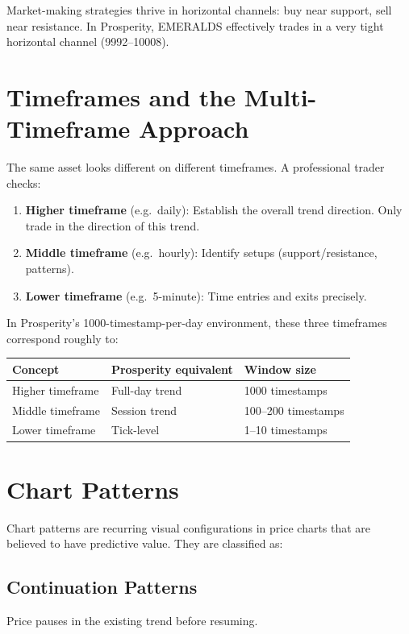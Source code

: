 \documentclass[12pt,a4paper,openany]{report}
\theoremstyle{definition}
\begin{document}
Market-making strategies thrive in horizontal channels: buy near support, sell near resistance. In Prosperity, EMERALDS effectively trades in a very tight horizontal channel (9992--10008).

\section{Timeframes and the Multi-Timeframe Approach}

The same asset looks different on different timeframes. A professional trader checks:
\begin{enumerate}[label=\arabic*.]
  \item \textbf{Higher timeframe} (e.g.\ daily): Establish the overall trend direction. Only trade in the direction of this trend.
  \item \textbf{Middle timeframe} (e.g.\ hourly): Identify setups (support/resistance, patterns).
  \item \textbf{Lower timeframe} (e.g.\ 5-minute): Time entries and exits precisely.
\end{enumerate}

In Prosperity's 1000-timestamp-per-day environment, these three timeframes correspond roughly to:
\begin{center}
\begin{tabular}{lll}
\toprule
\textbf{Concept} & \textbf{Prosperity equivalent} & \textbf{Window size} \\
\midrule
Higher timeframe & Full-day trend & 1000 timestamps \\
Middle timeframe & Session trend & 100--200 timestamps \\
Lower timeframe & Tick-level & 1--10 timestamps \\
\bottomrule
\end{tabular}
\end{center}

\section{Chart Patterns}

Chart patterns are recurring visual configurations in price charts that are believed to have predictive value. They are classified as:

\subsection{Continuation Patterns}
Price pauses in the existing trend before resuming.
\end{document}
